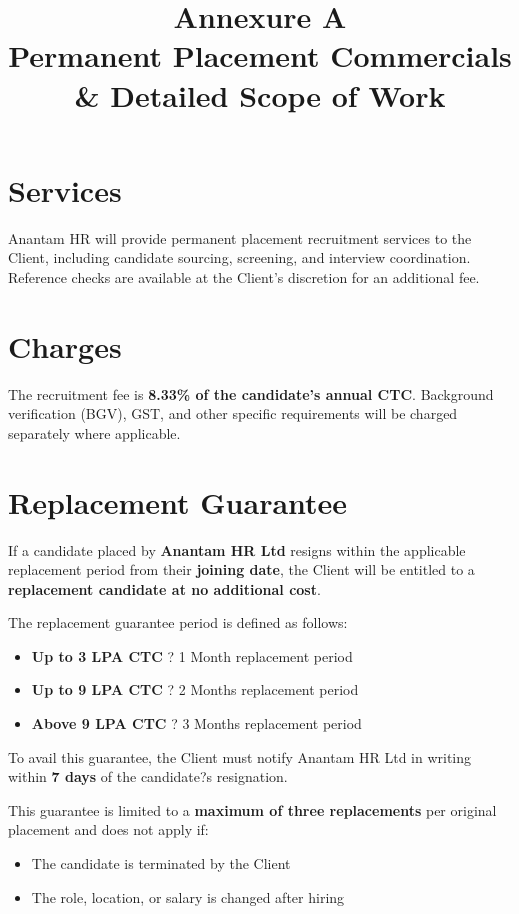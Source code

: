 \documentclass[12pt]{article}
\title{
\vspace{-1cm}
\textcolor{primary}{\Huge \textbf{Annexure A}} \\
\vspace{0.4cm}
\Large Permanent Placement Commercials \\
\Large \& Detailed Scope of Work
}
\date{}
\begin{document}
\maketitle
\thispagestyle{fancy}


\section{Services}

Anantam HR will provide permanent placement recruitment services to the Client, including candidate sourcing, screening, and interview coordination. Reference checks are available at the Client's discretion for an additional fee.

\section{Charges}

The recruitment fee is \textbf{8.33\% of the candidate's annual CTC}. Background verification (BGV), GST, and other specific requirements will be charged separately where applicable.

\section{Replacement Guarantee}

If a candidate placed by \textbf{Anantam HR Ltd} resigns within the applicable replacement period from their \textbf{joining date}, the Client will be entitled to a \textbf{replacement candidate at no additional cost}.

The replacement guarantee period is defined as follows:

\begin{itemize}[leftmargin=1.2cm]
\item \textbf{Up to 3 LPA CTC} ? 1 Month replacement period
\item \textbf{Up to 9 LPA CTC} ? 2 Months replacement period
\item \textbf{Above 9 LPA CTC} ? 3 Months replacement period
\end{itemize}

To avail this guarantee, the Client must notify Anantam HR Ltd in writing within \textbf{7 days} of the candidate?s resignation.

This guarantee is limited to a \textbf{maximum of three replacements} per original placement and does not apply if:

\begin{itemize}
\item The candidate is terminated by the Client
\item The role, location, or salary is changed after hiring
\end{itemize}
\end{document}
